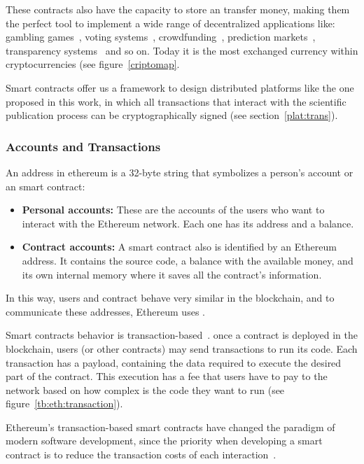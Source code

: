 These contracts also have the capacity to store an transfer money, making them
the perfect tool to implement a wide range of decentralized applications like:
gambling games~\cite{piasecki2016gaming}, voting
systems~\cite{mccorry2017smart}, crowdfunding~\cite{jacynycz2016betfunding},
prediction markets~\cite{peterson2015augur}, transparency
systems~\cite{bonneau2016ethiks} and so on. Today it is the most exchanged
currency within cryptocurrencies (see figure~\ref{criptomap}.

Smart contracts offer us a framework to design distributed platforms like the
one proposed in this work, in which all transactions that interact with the
scientific publication process can be cryptographically signed (see
section~\ref{plat:trans}).

\subsubsection*{Accounts and Transactions}
An address in ethereum is a 32-byte string that symbolizes a person's account or
an smart contract:
\begin{itemize}
\item \textbf{Personal accounts:} These are the accounts of the users who want
  to interact with the Ethereum network. Each one has its address and a balance.
\item \textbf{Contract accounts:} A smart contract also is identified by an
  Ethereum address. It contains the source code, a balance with the available
  money, and its own internal memory where it saves all the contract's
  information.
\end{itemize}

In this way, users and contract behave very similar in the blockchain, and to
communicate these addresses, Ethereum uses .


Smart contracts behavior is transaction-based~\cite{wood2014ethereum}. once a
contract is deployed in the blockchain, users (or other contracts) may send
transactions to run its code. Each transaction has a payload, containing the
data required to execute the desired part of the contract. This execution has a
fee that users have to pay to the network based on how complex is the code they
want to run (see figure~\ref{tb:eth:transaction}).

Ethereum's transaction-based smart contracts have changed the paradigm of modern
software development, since the priority when developing a smart contract is to
reduce the transaction costs of each interaction~\cite{delmolino2016step}.


